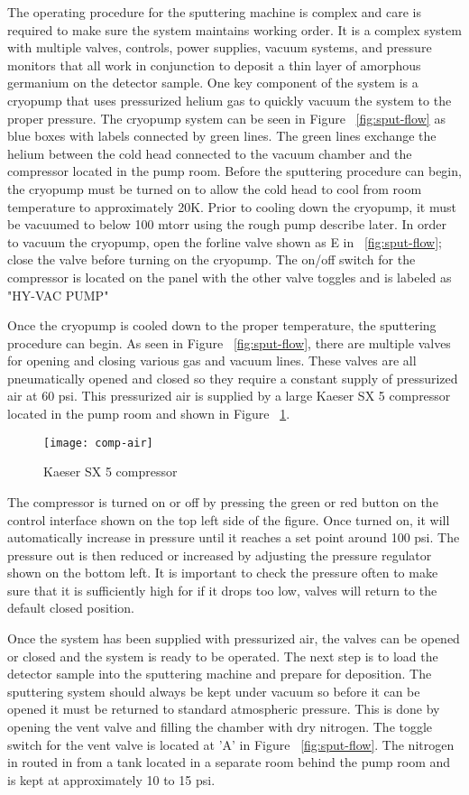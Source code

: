 The operating procedure for the sputtering machine is complex and care is required to make sure the system maintains working order.
It is a complex system with multiple valves, controls, power supplies, vacuum systems, and pressure monitors that all work in conjunction to deposit a thin layer of amorphous germanium on the detector sample.
One key component of the system is a cryopump that uses pressurized helium gas to quickly vacuum the system to the proper pressure.
The cryopump system can be seen in Figure ~\ref{fig:sput-flow} as blue boxes with labels connected by green lines.
The green lines exchange the helium between the cold head connected to the vacuum chamber and the compressor located in the pump room.
Before the sputtering procedure can begin, the cryopump must be turned on to allow the cold head to cool from room temperature to approximately 20K.
Prior to cooling down the cryopump, it must be vacuumed to below 100 mtorr using the rough pump describe later.
In order to vacuum the cryopump, open the forline valve shown as E in ~\ref{fig:sput-flow}; close the valve before turning on the cryopump.
The on/off switch for the compressor is located on the panel with the other valve toggles and is labeled as "HY-VAC PUMP"

Once the cryopump is cooled down to the proper temperature, the sputtering procedure can begin.
As seen in Figure ~\ref{fig:sput-flow}, there are multiple valves for opening and closing various gas and vacuum lines.
These valves are all pneumatically opened and closed so they require a constant supply of pressurized air at 60 psi.
This pressurized air is supplied by a large Kaeser SX 5 compressor located in the pump room and shown in Figure ~\ref{fig:comp-air}.
\begin{figure}[htpb]
\centering
\texttt{[image: comp-air]}
\caption{Kaeser SX 5 compressor}
\label{fig:comp-air}
\end{figure}
The compressor is turned on or off by pressing the green or red button on the control interface shown on the top left side of the figure.
Once turned on, it will automatically increase in pressure until it reaches a set point around 100 psi.
The pressure out is then reduced or increased by adjusting the pressure regulator shown on the bottom left.
It is important to check the pressure often to make sure that it is sufficiently high for if it drops too low, valves will return to the default closed position.

Once the system has been supplied with pressurized air, the valves can be opened or closed and the system is ready to be operated.
The next step is to load the detector sample into the sputtering machine and prepare for deposition.
The sputtering system should always be kept under vacuum so before it can be opened it must be returned to standard atmospheric pressure.
This is done by opening the vent valve and filling the chamber with dry nitrogen.
The toggle switch for the vent valve is located at 'A' in Figure ~\ref{fig:sput-flow}.
The nitrogen in routed in from a tank located in a separate room behind the pump room and is kept at approximately 10 to 15 psi.

